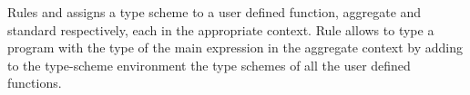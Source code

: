 Rules  and  assigns a type scheme to a user defined function, aggregate and standard respectively, each in the appropriate context. Rule  allows to type a program with the type of the main expression in the aggregate context by adding to the type-scheme environment the type schemes of all the user defined functions.
